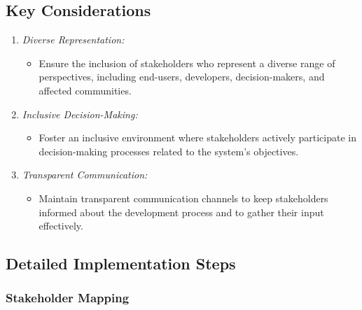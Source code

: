 \documentclass[12pt,a4paper,openright,twoside]{book}
\begin{document}
\subsection{Key Considerations}

\begin{enumerate}

    \item \emph{Diverse Representation:}

        \begin{itemize}

            \item Ensure the inclusion of stakeholders who represent a diverse range of perspectives, including end-users, developers, decision-makers, and affected communities.
        
        \end{itemize}
    
    \item \emph{Inclusive Decision-Making:}
        
    \begin{itemize}
    
        \item Foster an inclusive environment where stakeholders actively participate in decision-making processes related to the system's objectives.
    
    \end{itemize}
    
    \item \emph{Transparent Communication:}
    
    \begin{itemize}
    
        \item Maintain transparent communication channels to keep stakeholders informed about the development process and to gather their input effectively.
    
    \end{itemize}

\end{enumerate}

\subsection{Detailed Implementation Steps}

\subsubsection{Stakeholder Mapping}
\end{document}
